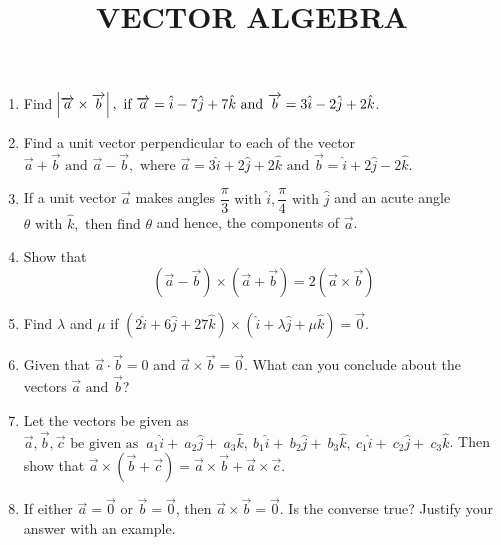 \documentclass[12pt]{article}
\begin{document}
\title{\textbf{VECTOR ALGEBRA}}
\maketitle
\begin{center}
\end{center}

\begin{enumerate}
\section*{12$^{th}$ Maths - Chapter 10}

\item Find $\abs{\overrightarrow{a}\times\overrightarrow{b}},\text{ if }\overrightarrow{a}=\hat{i}-7\hat{j}+7\hat{k}\text{ and } \overrightarrow{b}=3\hat{i}-2\hat{j}+2\hat{k}$.
\item Find a unit vector perpendicular to each of the vector $\overrightarrow{a}+\overrightarrow{b}\text{ and }\overrightarrow{a}-\overrightarrow{b},\text{ where } \overrightarrow{a}=3\hat{i}+2\hat{j}+2\hat{k}\text{ and } \overrightarrow{b}=\hat{i}+2\hat{j}-2\hat{k}$. 
\item If a unit vector $\overrightarrow{a}$ makes angles $\dfrac{\pi}{3}\text{ with }\hat{i}, \dfrac{\pi}{4}\text{ with }\hat{j}$ and an acute angle $\theta \text{ with }\hat{k},\text{ then find } \theta$ and hence, the components of $\overrightarrow{a}$.
\item Show that $$(\overrightarrow{a}-\overrightarrow{b})\times (\overrightarrow{a}+\overrightarrow{b})=2(\overrightarrow{a}\times \overrightarrow{b})$$
\item Find $\lambda$ and $\mu$ if $(2\hat{i}+6\hat{j}+27\hat{k})\times(\hat{i}+\lambda \hat{j} + \mu \hat{k})=\overrightarrow{0}$.
\item Given that $\overrightarrow{a} \cdot \overrightarrow{b} = 0$ and $\overrightarrow{a} \times \overrightarrow{b} = \overrightarrow{0}$. What can you conclude about the vectors $\overrightarrow{a} \text{ and }\overrightarrow{b}$?
\item Let the vectors be given as $\overrightarrow{a},\overrightarrow{b},\overrightarrow{c}\text{ be given as }\ a_1 \hat{i}+\ a_2 \hat{j}+\ a_3 \hat{k},\ b_1 \hat{i}+\ b_2 \hat{j}+\ b_3 \hat{k},\ c_1 \hat{i}+\ c_2 \hat{j}+\ c_3 \hat{k}$. Then show that $\overrightarrow{a} \times (\overrightarrow{b} + \overrightarrow{c}) = \overrightarrow{a} \times \overrightarrow{b}+\overrightarrow{a} \times \overrightarrow{c}$.
\item If either $\overrightarrow{a} = \overrightarrow{0}$ or $\overrightarrow{b} = \overrightarrow{0}$, then $\overrightarrow{a} \times \overrightarrow{b} = \overrightarrow{0}$. Is the converse true? Justify your answer with an example.

\end{enumerate}
\end{document}

